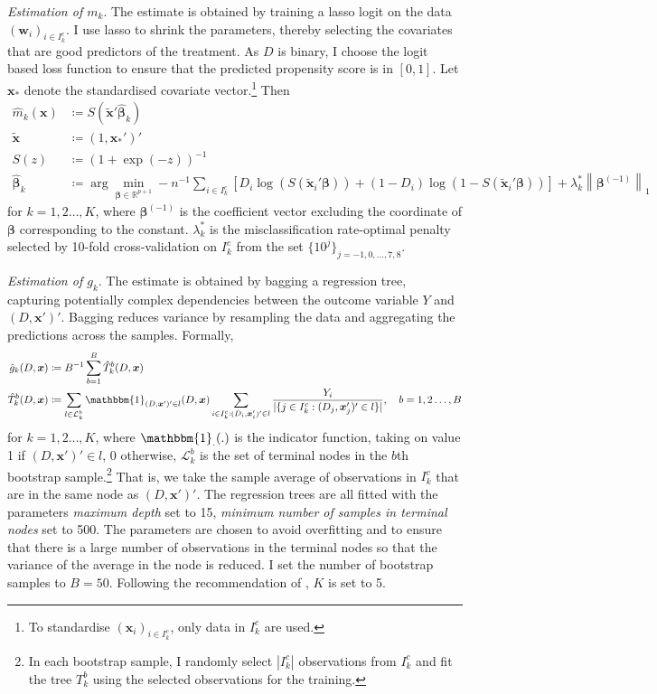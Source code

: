 \documentclass[a4paper,12pt]{article}
\newcommand{\tld}[1]{\tilde{#1}}
\newcommand{\fr}[2]{\frac{#1}{#2}}
\newcommand{\h}[1]{\hat{#1}}
\newcommand{\norm}[2]{\left\lVert{#2}\right\rVert_{#1}}
\newcommand{\ceq}{\coloneqq}  %
\newcommand{\real}{\mathbb{R}}
\begin{document}
\noindent \textit{Estimation of $m_k$}. The estimate is obtained by training a lasso logit on the data $(\bm{w}_i)_{i\in I^c_k}$. I use lasso to shrink the parameters, thereby selecting the covariates that are good predictors of the treatment. As $D$ is binary, I choose the logit based loss function to ensure that the predicted propensity score is in $[0,1]$.
Let $\bm{x}_{*}$ denote the standardised covariate vector.\footnote{To standardise $(\bm{x}_i)_{i\in I_k^c}$, only data in $I_k^c$ are used.} Then
\begin{align*}
\hat{m}_k(\bm{x}) &\ceq S(\tld{\bm{x}}'\hat{\bm{\beta}}_k) \\
\tld{\bm{x}} &\ceq (1, \bm{x}_*')' \\
S(z) &\ceq (1+\exp(-z))^{-1} \\
\hat{\bm{\beta}}_k&\ceq \arg\min_{\bm{\beta}\in\real^{p+1}} -n^{-1}\sum_{i\in I^c_k}[D_i\log(S(\tld{\bm{x}}_{i}'\bm{\beta}))+(1-D_i)\log(1-S(\tld{\bm{x}}_i'\bm{\beta}))] +\lambda_k^* \norm{1}{\bm{\beta}^{(-1)}}
\end{align*}
for $k=1,2\ldots,K$, where $\bm{\beta}^{(-1)}$ is the coefficient vector excluding the coordinate of  $\bm{\beta}$ corresponding to the constant. $\lambda_k^*$ is the misclassification rate-optimal penalty selected by 10-fold cross-validation on $I^c_k$ from the set $\{10^j\}_{j=-1,0,\ldots,7,8}$.


\noindent \textit{Estimation of $g_k$}. The estimate is obtained by bagging a regression tree, capturing  potentially complex dependencies between the outcome variable $Y$ and $(D, \bm{x}')'$. Bagging reduces variance by resampling the data and aggregating the predictions across the samples.
Formally,
\begin{align*}
\h{g}_k(D,\bm{x}) &\ceq B^{-1}\sum_{b=1}^B \h{T}_k^b(D,\bm{x}) \\
\h{T}_k^b(D,\bm{x}) &\ceq \sum_{l\in \mathcal{L}^b_k}\mathbbm{1}_{(D,\bm{x}')'\in l}(D, \bm{x})\sum_{i\in I_k^c: (D_i,\bm{x}_i')'\in l} \fr{Y_i}{|\{j\in I_k^c: (D_j,\bm{x}_j')'\in l\}|},\quad b=1,2\ldots,B
\end{align*}
for $k=1,2\ldots,K$, where $\mathbbm{1}_{.}(.)$ is the indicator function, taking on value 1 if $(D,\bm{x}')'\in l$, 0 otherwise, $\mathcal{L}^b_k$ is the set of terminal nodes in the $b$th bootstrap sample.\footnote{In each bootstrap sample, I randomly select $|I_k^c|$ observations from $I_k^c$ and fit the tree $T^b_k$ using the selected observations for the training.} That is, we take the sample average of observations in $I_k^c$ that are in the same node as $(D,\bm{x}')'$.  The regression trees are all fitted with the parameters \textit{maximum depth} set to 15, \textit{minimum number of samples in terminal nodes} set to 500. The parameters are chosen to avoid overfitting and to ensure that there is a large number of observations in the terminal nodes so that the variance of the average in the node is reduced. I set the number of bootstrap samples to $B=50$. Following the recommendation of \cite{chernozhukov2016}, $K$ is set to 5.
\end{document}
